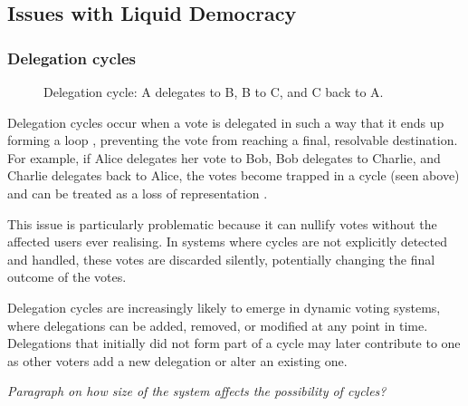 \subsection{Issues with Liquid Democracy}

\subsubsection{Delegation cycles}
\begin{figure}[h]
    \centering
    \caption{Delegation cycle: A delegates to B, B to C, and C back to A.}
    \label{fig:triangle-cycle}
\end{figure}


Delegation cycles occur when a vote is delegated in such a way that it ends up forming a loop \citep{brill_liquid_2022}, preventing the vote from reaching a final, resolvable destination. For example, if Alice delegates her vote to Bob, Bob delegates to Charlie, and Charlie delegates back to Alice, the votes become trapped in a cycle (seen above) and can be treated as a loss of representation \citep{christoff2017liquiddemocracyanalysisbinary}.

This issue is particularly problematic because it can nullify votes without the affected users ever realising. In systems where cycles are not explicitly detected and handled, these votes are discarded silently, potentially changing the final outcome of the votes.

Delegation cycles are increasingly likely to emerge in dynamic voting systems, where delegations can be added, removed, or modified at any point in time. Delegations that initially did not form part of a cycle may later contribute to one as other voters add a new delegation or alter an existing one.

\textit{Paragraph on how size of the system affects the possibility of cycles?}

